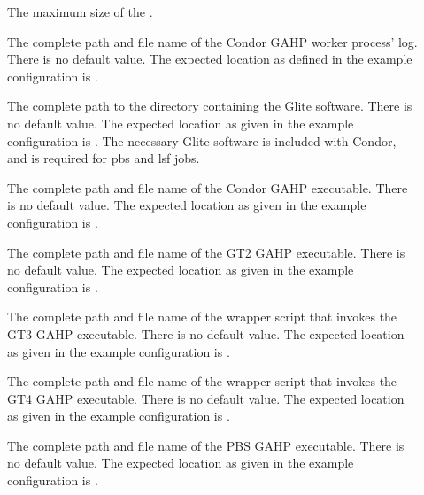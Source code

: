 \begin{description}
\item[]
\label{param:MaxCGAHPLog} The maximum size of the .

\item[]
\label{param:CGAHPWorkerThreadLog} The complete path and file name of the
Condor GAHP worker process' log.
There is no default value. The expected location as defined
in the example configuration is .

\item[]
\label{param:GLITELocation} The complete path to the directory
containing the Glite software.
There is no default value. The expected location as given
in the example configuration is .
The necessary Glite software is included with Condor,
and is required for pbs and lsf jobs.

\item[]
\label{param:CondorGAHP} The complete path and file name of the
Condor GAHP executable.
There is no default value. The expected location as given
in the example configuration is .

\item[]
\label{param:GT2GAHP} The complete path and file name of the
GT2 GAHP executable.
There is no default value. The expected location as given
in the example configuration is .

\item[]
\label{param:GT3GAHP} The complete path and file name of the
wrapper script that invokes the GT3 GAHP executable.
There is no default value. The expected location as given
in the example configuration is .

\item[]
\label{param:GT4GAHP} The complete path and file name of the
wrapper script that invokes the GT4 GAHP executable.
There is no default value. The expected location as given
in the example configuration is .

\item[]
\label{param:PBSGAHP} The complete path and file name of the
PBS GAHP executable.
There is no default value. The expected location as given
in the example configuration is .


\end{description}
